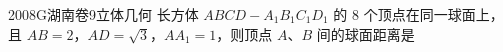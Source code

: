 
\begin{problem}{2008}{G}{湖南卷}{9}{立体几何}
长方体 $ABCD-A_1B_1C_1D_1$ 的 $8$ 个顶点在同一球面上，且 $AB=2$，$AD=\sqrt{3}$，$AA_1=1$，则顶点 $A$、$B$ 间的球面距离是
\begin{choices}
\end{choices}
\end{problem}

\begin{answer}

\end{answer}

\begin{solutions}

\end{solutions}